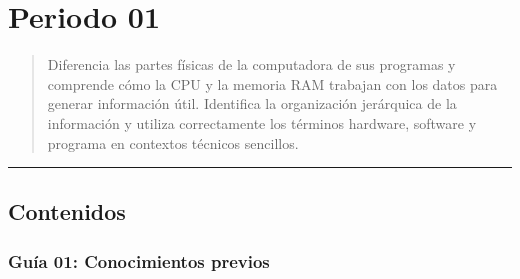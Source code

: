 \documentclass[letterpaper,10pt,spanish]{sphinxmanual}
\begin{document}
\section{Periodo 01}
\label{\detokenize{cursos/ofimatica11/periodo01/index:periodo-01}}\label{\detokenize{cursos/ofimatica11/periodo01/index::doc}}\begin{quote}\begin{description}
\sphinxAtStartPar
Diferencia las partes físicas de la computadora de sus programas y comprende cómo la CPU y la memoria RAM trabajan con los datos para generar información útil. Identifica la organización jerárquica de la información y utiliza correctamente los términos hardware, software y programa en contextos técnicos sencillos.

\end{description}\end{quote}


\bigskip\hrule\bigskip



\subsection{Contenidos}
\label{\detokenize{cursos/ofimatica11/periodo01/index:contenidos}}
\sphinxstepscope


\subsubsection{Guía 01: Conocimientos previos}
\label{\detokenize{cursos/ofimatica11/periodo01/G01:guia-01-conocimientos-previos}}\label{\detokenize{cursos/ofimatica11/periodo01/G01::doc}}
\end{document}
